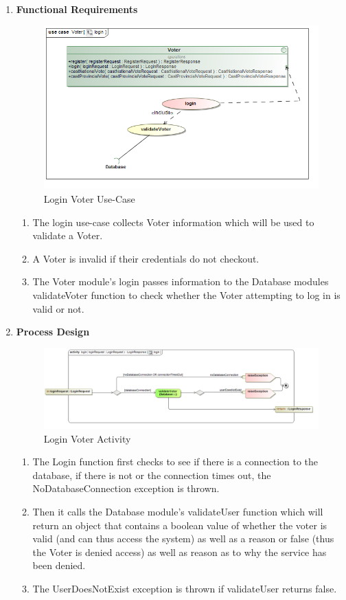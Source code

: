 \begin{enumerate}
\begin{enumerate}
			\newpage
			
			\item \textbf{Functional Requirements}
			\begin{figure}[H]
				\centering
				\includegraphics[width=0.75\linewidth]{../Images/Voter/UseCases/login_useCase.png}
				\caption{Login Voter Use-Case}
			\end{figure}
			
			\begin{enumerate}
				\item The login use-case collects Voter information which will be used to validate a Voter. 
				\item A Voter is invalid if their credentials do not checkout. 
				\item The Voter module's login passes information to the Database modules validateVoter function to check whether the Voter attempting to log in is valid or not.  
			\end{enumerate}
			
			\item \textbf{Process Design}
			\begin{figure}[H]
				\centering
				\includegraphics[width=0.75\linewidth]{../Images/Voter/ActivityDiagrams/login_activity.png}
				\caption{Login Voter Activity}
			\end{figure}
			
			
			\begin{enumerate}
				\item The Login function first checks to see if there is a connection to the database, if there is not or the connection times out, the NoDatabaseConnection exception is thrown.
				\item Then it calls the Database module's validateUser function which will return an object that contains a boolean value of whether the voter is valid (and can thus access the system) as well as a reason or false (thus the Voter is denied access) as well as reason as to why the service has been denied. 
				\item The UserDoesNotExist exception is thrown if validateUser returns false. 
			\end{enumerate}			
		\end{enumerate}


\end{enumerate}
